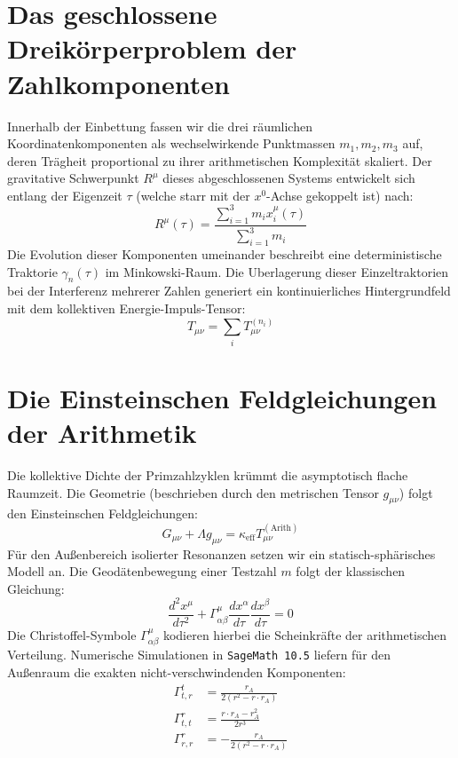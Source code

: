 \documentclass[11pt,a4paper,nofootinbib]{article}
\begin{document}
\section{Das geschlossene Dreikörperproblem der Zahlkomponenten}
Innerhalb der Einbettung fassen wir die drei räumlichen Koordinatenkomponenten als wechselwirkende Punktmassen $m_1, m_2, m_3$ auf, deren Trägheit proportional zu ihrer arithmetischen Komplexität skaliert. Der gravitative Schwerpunkt $R^\mu$ dieses abgeschlossenen Systems entwickelt sich entlang der Eigenzeit $\tau$ (welche starr mit der $x^0$-Achse gekoppelt ist) nach:
\begin{equation}
    R^\mu(\tau) = \frac{\sum_{i=1}^3 m_i x_i^\mu(\tau)}{\sum_{i=1}^3 m_i}
\end{equation}
Die Evolution dieser Komponenten umeinander beschreibt eine deterministische Traktorie $\gamma_n(\tau)$ im Minkowski-Raum. Die Uberlagerung dieser Einzeltraktorien bei der Interferenz mehrerer Zahlen generiert ein kontinuierliches Hintergrundfeld mit dem kollektiven Energie-Impuls-Tensor:
\begin{equation}
    T_{\mu\nu} = \sum_{i} T_{\mu\nu}^{(n_i)}
\end{equation}

\section{Die Einsteinschen Feldgleichungen der Arithmetik}
Die kollektive Dichte der Primzahlzyklen krümmt die asymptotisch flache Raumzeit. Die Geometrie (beschrieben durch den metrischen Tensor $g_{\mu\nu}$) folgt den Einsteinschen Feldgleichungen:
\begin{equation}
    G_{\mu\nu} + \Lambda g_{\mu\nu} = \kappa_{\text{eff}} T_{\mu\nu}^{(\text{Arith})}
\end{equation}
Für den Außenbereich isolierter Resonanzen setzen wir ein statisch-sphärisches Modell an. Die Geodätenbewegung einer Testzahl $m$ folgt der klassischen Gleichung:
\begin{equation}
    \frac{d^2 x^\mu}{d\tau^2} + \Gamma^\mu_{\alpha\beta} \frac{dx^\alpha}{d\tau} \frac{dx^\beta}{d\tau} = 0
\end{equation}
Die Christoffel-Symbole $\Gamma^\mu_{\alpha\beta}$ kodieren hierbei die Scheinkräfte der arithmetischen Verteilung. Numerische Simulationen in \texttt{SageMath 10.5} liefern für den Außenraum die exakten nicht-verschwindenden Komponenten:
\begin{align}
    \Gamma^t_{t,r} &= \frac{r_A}{2(r^2 - r \cdot r_A)} \\
    \Gamma^r_{t,t} &= \frac{r \cdot r_A - r_A^2}{2r^3} \\
    \Gamma^r_{r,r} &= -\frac{r_A}{2(r^2 - r \cdot r_A)}
\end{align}
\end{document}

